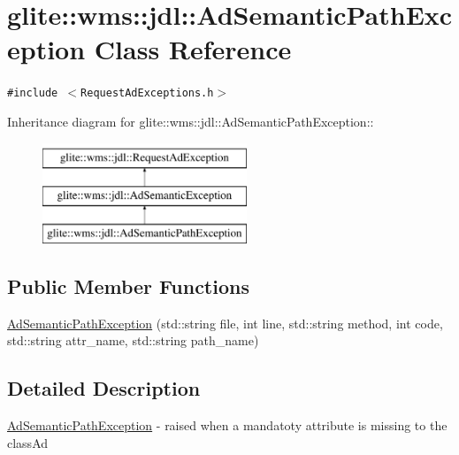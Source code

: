 \hypertarget{classglite_1_1wms_1_1jdl_1_1AdSemanticPathException}{
\section{glite::wms::jdl::Ad\-Semantic\-Path\-Exception Class Reference}
\label{classglite_1_1wms_1_1jdl_1_1AdSemanticPathException}
}
{\tt \#include $<$Request\-Ad\-Exceptions.h$>$}

Inheritance diagram for glite::wms::jdl::Ad\-Semantic\-Path\-Exception::\begin{figure}[H]
\begin{center}
\leavevmode
\includegraphics[height=3cm]{classglite_1_1wms_1_1jdl_1_1AdSemanticPathException}
\end{center}
\end{figure}
\subsection*{Public Member Functions}
\begin{CompactItemize}
\item 
\hyperlink{classglite_1_1wms_1_1jdl_1_1AdSemanticPathException_a0}{Ad\-Semantic\-Path\-Exception} (std::string file, int line, std::string method, int code, std::string attr\_\-name, std::string path\_\-name)
\end{CompactItemize}


\subsection{Detailed Description}
\hyperlink{classglite_1_1wms_1_1jdl_1_1AdSemanticPathException}{Ad\-Semantic\-Path\-Exception} - raised when a mandatoty attribute is missing to the class\-Ad 



